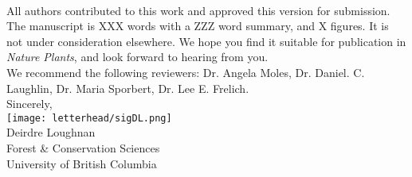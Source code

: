 \documentclass[11pt,a4paper]{article}
\begin{document}
\vspace{1.5ex}\\
\noindent All authors contributed to this work and approved this version for submission. The manuscript is XXX words with a ZZZ word summary, and X figures. It is not under consideration elsewhere. We hope you find it suitable for publication in \emph{Nature Plants}, and look forward to hearing from you. 
\vspace{1.5ex}\\
\noindent We recommend the following reviewers: Dr. Angela Moles,  Dr. Daniel. C. Laughlin, Dr. Maria Sporbert, Dr. Lee E. Frelich.
\vspace{1.5ex}\\
\noindent Sincerely, \\
\texttt{[image: letterhead/sigDL.png]} \\
\noindent Deirdre Loughnan\\
\noindent Forest \& Conservation Sciences\\
\noindent University of British Columbia

\newpage

\vspace{-5ex}
% 


\newpage
\end{document}
